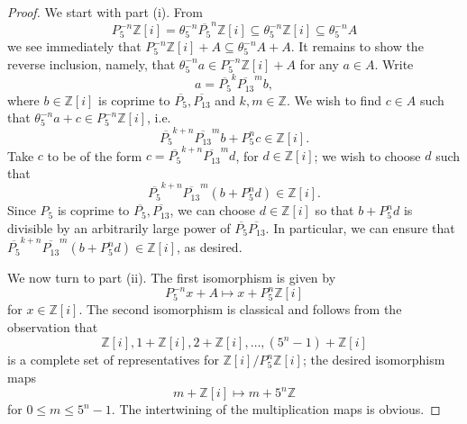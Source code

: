 \documentclass[11pt]{amsart}
\theoremstyle{definition}
\newcommand{\Z}{{\mathbb Z}}
\begin{document}
\begin{proof}
We start with part (i).  From $$P_5^{-n}\Z[i]=\theta_5^{-n} \overline{P_5}^n \Z[i] \subseteq \theta_5^{-n}\Z[i] \subseteq \theta_5^{-n}A$$ we see immediately that $P_5^{-n}\Z[i]+A \subseteq \theta_5^{-n}A+A$.  It remains to show the reverse inclusion, namely, that $\theta_5^{-n}a \in P_5^{-n}\Z[i]+A$ for any $a \in A$.  Write $$a=\overline{P_5}^{k} \overline{P_{13}}^m b,$$ where $b \in \Z[i]$ is coprime to $\overline{P_5}, \overline{P_{13}}$ and $k,m \in \Z$.  We wish to find $c \in A$ such that $\theta_5^{-n}a+c \in P_5^{-n}\Z[i]$, i.e.
$$\overline{P_5}^{k+n} \overline{P_{13}}^m b+P_5^n c \in \Z[i].$$
Take $c$ to be of the form $c=\overline{P_5}^{k+n} \overline{P_{13}}^m d$, for $d \in \Z[i]$; we wish to choose $d$ such that
$$\overline{P_5}^{k+n} \overline{P_{13}}^m(b+P_5^n d) \in \Z[i].$$
Since $P_5$ is coprime to $\overline{P_5}, \overline{P_{13}}$, we can choose $d \in \Z[i]$ so that $b+P_5^n d$ is divisible by an arbitrarily large power of $\overline{P_5}\overline{P_{13}}$.  In particular, we can ensure that $\overline{P_5}^{k+n} \overline{P_{13}}^m(b+P_5^n d) \in \Z[i]$, as desired.

We now turn to part (ii).  The first isomorphism is given by $$P_5^{-n}x+A \mapsto x+P_5^n \Z[i]$$ for $x \in \Z[i]$.  The second isomorphism is classical and follows from the observation that
$$\Z[i], 1+\Z[i], 2+\Z[i], \ldots, (5^n-1)+\Z[i]$$
is a complete set of representatives for $\Z[i]/P_5^n \Z[i]$; the desired isomorphism maps $$m+\Z[i] \mapsto m+5^n \Z$$ for $0 \leq m \leq 5^n-1$.  The intertwining of the multiplication maps is obvious.
\end{proof}
\end{document}
